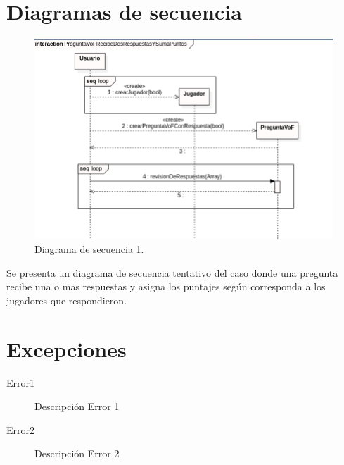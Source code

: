 \documentclass[titlepage,a4paper]{article}
\begin{document}
\section{Diagramas de secuencia}\label{sec:diagramasdesecuencia}

\begin{figure}[H]
\centering
\includegraphics[width=1.35\textwidth, center]{Diagrama de secuencia.png}
\caption{\label{fig:seq01}Diagrama de secuencia 1.}
\end{figure}

Se presenta un diagrama de secuencia tentativo del caso donde una pregunta recibe una o mas respuestas y asigna los puntajes según corresponda a los jugadores que respondieron.


\section{Excepciones}\label{sec:excepciones}

\begin{description}
\item[Error1] Descripción Error 1
\item[Error2] Descripción Error 2
\end{description}
\end{document}
